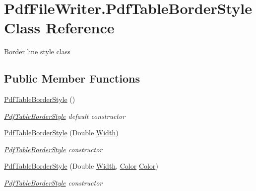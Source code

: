 \hypertarget{class_pdf_file_writer_1_1_pdf_table_border_style}{}\section{Pdf\+File\+Writer.\+Pdf\+Table\+Border\+Style Class Reference}
\label{class_pdf_file_writer_1_1_pdf_table_border_style}


Border line style class  


\subsection*{Public Member Functions}
\begin{DoxyCompactItemize}
\item 
\hyperlink{class_pdf_file_writer_1_1_pdf_table_border_style_a9c5b9525cfb3dac8be8113eddd359ae1}{Pdf\+Table\+Border\+Style} ()
\begin{DoxyCompactList}\small\item\em \hyperlink{class_pdf_file_writer_1_1_pdf_table_border_style}{Pdf\+Table\+Border\+Style} default constructor \end{DoxyCompactList}\item 
\hyperlink{class_pdf_file_writer_1_1_pdf_table_border_style_afa8cfd1186d85084c44499af7bbce04a}{Pdf\+Table\+Border\+Style} (Double \hyperlink{class_pdf_file_writer_1_1_pdf_table_border_style_af23b07561b8fc98b8e654f29c2bc2161}{Width})
\begin{DoxyCompactList}\small\item\em \hyperlink{class_pdf_file_writer_1_1_pdf_table_border_style}{Pdf\+Table\+Border\+Style} constructor \end{DoxyCompactList}\item 
\hyperlink{class_pdf_file_writer_1_1_pdf_table_border_style_ab6ebc8edc8b8a8673b34ffa9aac799df}{Pdf\+Table\+Border\+Style} (Double \hyperlink{class_pdf_file_writer_1_1_pdf_table_border_style_af23b07561b8fc98b8e654f29c2bc2161}{Width}, \hyperlink{class_pdf_file_writer_1_1_pdf_table_border_style_a5b320d665ea45b78503c4990843faa9b}{Color} \hyperlink{class_pdf_file_writer_1_1_pdf_table_border_style_a5b320d665ea45b78503c4990843faa9b}{Color})
\begin{DoxyCompactList}\small\item\em \hyperlink{class_pdf_file_writer_1_1_pdf_table_border_style}{Pdf\+Table\+Border\+Style} constructor \end{DoxyCompactList}\end{DoxyCompactItemize}
